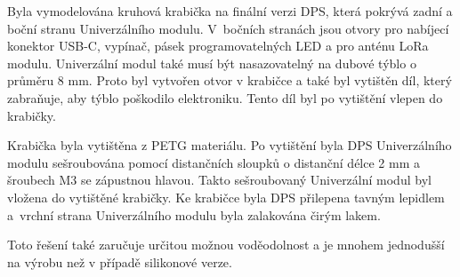 Byla vymodelována kruhová krabička na finální verzi DPS, která pokrývá zadní a boční stranu Univerzálního modulu. V~bočních stranách jsou otvory pro nabíjecí konektor USB-C, vypínač, pásek programovatelných 
LED a pro anténu LoRa modulu. Univerzální modul také musí být nasazovatelný na dubové týblo o průměru 8 mm. Proto byl vytvořen otvor v krabičce a také byl vytištěn díl, který zabraňuje, aby týblo poškodilo 
elektroniku. Tento díl byl po vytištění vlepen do krabičky.  

Krabička byla vytištěna z PETG materiálu. Po vytištění byla DPS Univerzálního modulu sešroubována pomocí distančních sloupků o distanční délce 2 mm a šroubech M3 se zápustnou hlavou. Takto sešroubovaný Univerzální 
modul byl vložena do vytištěné krabičky. Ke krabičce byla DPS přilepena tavným lepidlem a~vrchní strana Univerzálního modulu byla zalakována čirým lakem. 

Toto řešení také zaručuje určitou možnou voděodolnost a je mnohem jednodušší na výrobu než v případě silikonové verze. 




